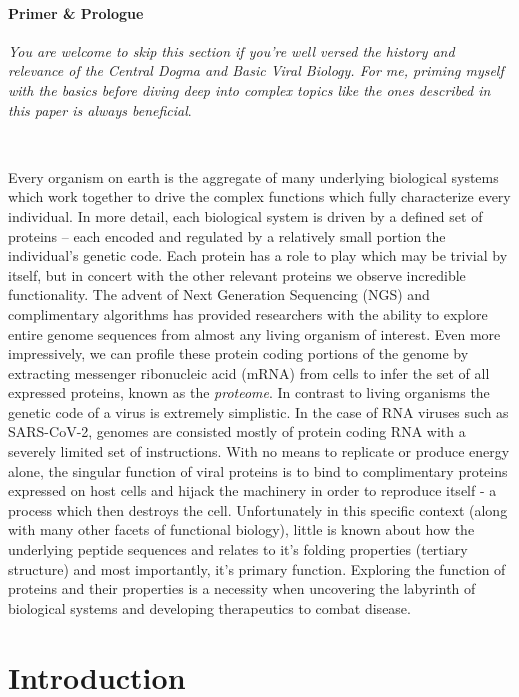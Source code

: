\documentclass{article}
\begin{document}
\paragraph{Primer \& Prologue}
\textit{You are welcome to skip this section if you're well versed the history and relevance of the Central Dogma and Basic Viral Biology. 
For me, priming myself with the basics before diving deep into complex topics like the ones described in this paper is always beneficial}.

~

Every organism on earth is the aggregate of many underlying biological systems which work together to drive the complex functions which fully characterize every individual.
In more detail, each biological system is driven by a defined set of proteins -- each encoded and regulated by a relatively small portion the individual's genetic code.
Each protein has a role to play which may be trivial by itself, but in concert with the other relevant proteins we observe incredible functionality. 
The advent of Next Generation Sequencing (NGS) and complimentary algorithms has provided researchers with the ability to explore entire genome sequences from almost any living organism of interest.
Even more impressively, we can profile these protein coding portions of the genome by extracting messenger ribonucleic acid (mRNA) from cells to infer the set of all expressed proteins, known as the \textit{proteome}. 
In contrast to living organisms the genetic code of a virus is extremely simplistic. 
In the case of RNA viruses such as SARS-CoV-2, genomes are consisted mostly of protein coding RNA with a severely limited set of instructions.
With no means to replicate or produce energy alone, the singular function of viral proteins is to bind to complimentary proteins expressed on host cells and hijack the machinery in order to reproduce itself - a process which then destroys the cell.
Unfortunately in this specific context (along with many other facets of functional biology), little is known about how the underlying peptide sequences and relates to it's folding properties (tertiary structure) and most importantly, it's primary function.
Exploring the function of proteins and their properties is a necessity when uncovering the labyrinth of biological systems and developing therapeutics to combat disease.

\section*{Introduction}
\end{document}
